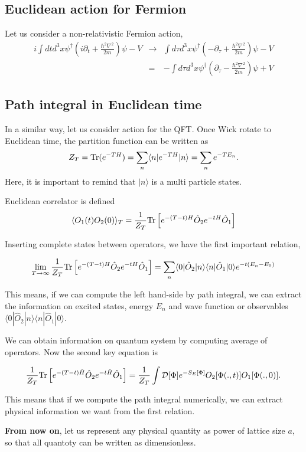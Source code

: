 \documentclass[10pt]{book}
\newcommand{\bea}{\begin{eqnarray}}
\newcommand{\eea}{\end{eqnarray}}
\newcommand{\no}{\nonumber \\}
\newcommand{\del}{\partial}
\def\la{\langle}
\def\ra{\rangle}
\begin{document}
\subsection{Euclidean action for Fermion}
Let us consider a non-relativistic Fermion action,
\bea 
i\int dt d^3x \psi^\dagger(i\del_t+\frac{\hbar^2\nabla^2}{2m})\psi-V
&\to& \int d\tau d^3x \psi^\dagger(-\del_\tau+\frac{\hbar^2\nabla^2}{2m})\psi-V \no 
  &=& -\int d\tau d^3x \psi^\dagger(\del_\tau-\frac{\hbar^2\nabla^2}{2m})\psi+V
\eea 

\subsection{Path integral in Euclidean time}
In a similar way, let us consider action for the QFT. 
Once Wick rotate to Euclidean time, the partition function can be written as
\bea
Z_T={\rm Tr}(e^{-TH})=\sum_n \la n| e^{-TH}|n\ra=\sum_n e^{-TE_n}. 
\eea
Here, it is important to remind that $|n\ra$ is a multi particle states.

Euclidean correlator is defined
\bea 
\la O_1(t) O_2(0)\ra_{T}=\frac{1}{Z_T}{\rm Tr}
  \left[e^{-(T-t)H}\hat{O}_2e^{-tH}\hat{O}_1\right] 
\eea 

Inserting complete states between operators, 
we have the first important relation,
\begin{framed}
\bea 
\lim_{T\to \infty} \frac{1}{Z_T}{\rm Tr}\left[
       e^{-(T-t)H}\hat{O}_2e^{-tH}\hat{O}_1\right]
       =\sum_{n}\la 0|\hat{O}_2|n\ra \la n|\hat{O}_1|0\ra e^{-t (E_n-E_0)}
\eea 
\end{framed}
This means, if we can compute the left hand-side by path integral,
we can extract the information on excited states, energy $E_n$ and wave function
or observables $\la 0|\hat{O}_2|n\ra \la n|\hat{O}_1|0\ra$. 

We can obtain information on quantum system by computing 
average of operators. Now the second key equation is
\begin{framed}
	\bea
	\frac{1}{Z_T}{\rm Tr}\left[e^{-(T-t)\hat{H}}\hat{O}_2 e^{-t\hat{H}}\hat{O}_1
	\right] 
	=\frac{1}{Z_T}\int{\cal D}[\Phi] e^{-S_E[\Phi]} O_2[\Phi(.,t)]O_1[\Phi(.,0)]. 
	\eea 
\end{framed}
This means that if we compute the path integral numerically, 
we can extract physical information we want from the first relation.

{\bf From now on}, let us represent any physical quantity as power of lattice size $a$,
so that all quantoty can be written as dimensionless.
\end{document}
